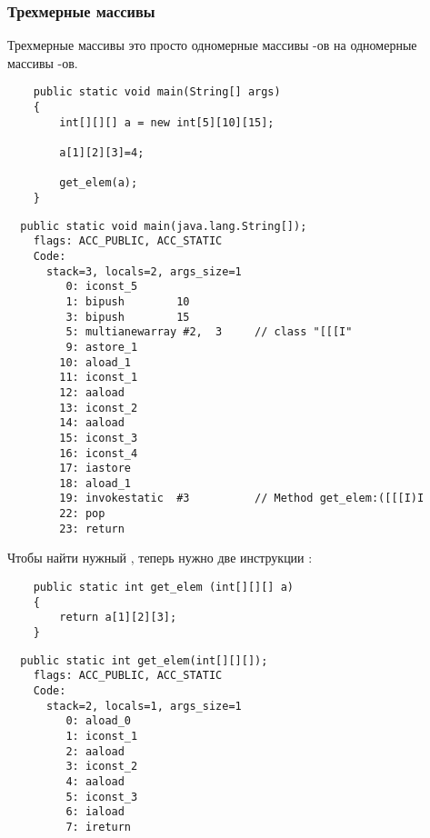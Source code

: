 \subsubsection{Трехмерные массивы}


Трехмерные массивы это просто одномерные массивы -ов на одномерные массивы 
-ов.

\begin{lstlisting}
	public static void main(String[] args)
	{
		int[][][] a = new int[5][10][15];

		a[1][2][3]=4;

		get_elem(a);
	}
\end{lstlisting}

\begin{lstlisting}
  public static void main(java.lang.String[]);
    flags: ACC_PUBLIC, ACC_STATIC
    Code:
      stack=3, locals=2, args_size=1
         0: iconst_5      
         1: bipush        10
         3: bipush        15
         5: multianewarray #2,  3     // class "[[[I"
         9: astore_1      
        10: aload_1       
        11: iconst_1      
        12: aaload        
        13: iconst_2      
        14: aaload        
        15: iconst_3      
        16: iconst_4      
        17: iastore       
        18: aload_1       
        19: invokestatic  #3          // Method get_elem:([[[I)I
        22: pop           
        23: return        
\end{lstlisting}


Чтобы найти нужный , теперь нужно две инструкции :

\begin{lstlisting}
	public static int get_elem (int[][][] a)
	{
		return a[1][2][3];
	}
\end{lstlisting}

\begin{lstlisting}
  public static int get_elem(int[][][]);
    flags: ACC_PUBLIC, ACC_STATIC
    Code:
      stack=2, locals=1, args_size=1
         0: aload_0       
         1: iconst_1      
         2: aaload        
         3: iconst_2      
         4: aaload        
         5: iconst_3      
         6: iaload        
         7: ireturn       
\end{lstlisting}
